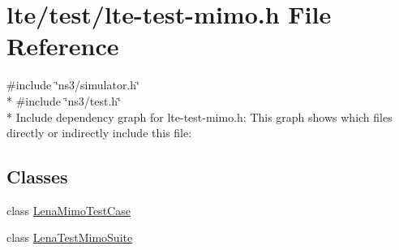 \hypertarget{lte-test-mimo_8h}{}\section{lte/test/lte-\/test-\/mimo.h File Reference}
\label{lte-test-mimo_8h}
{\ttfamily \#include \char`\"{}ns3/simulator.\+h\char`\"{}}\\*
{\ttfamily \#include \char`\"{}ns3/test.\+h\char`\"{}}\\*
Include dependency graph for lte-\/test-\/mimo.h\+:
This graph shows which files directly or indirectly include this file\+:
\subsection*{Classes}
\begin{DoxyCompactItemize}
\item 
class \hyperlink{classLenaMimoTestCase}{Lena\+Mimo\+Test\+Case}
\item 
class \hyperlink{classLenaTestMimoSuite}{Lena\+Test\+Mimo\+Suite}
\end{DoxyCompactItemize}
